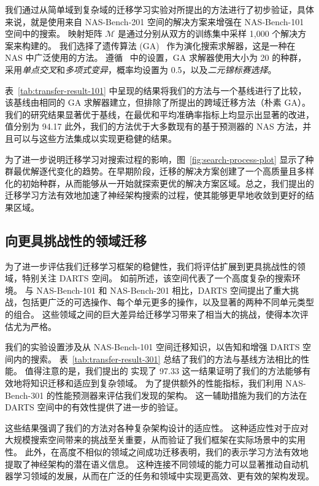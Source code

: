 \documentclass[../main_zh.tex]{subfiles}
\begin{document}
我们通过从简单域到复杂域的迁移学习实验对所提出的方法进行了初步验证，具体来说，就是使用来自 NAS-Bench-201 空间的解决方案来增强在 NAS-Bench-101 空间中的搜索。
映射矩阵 \( \mathcal{M} \) 是通过分别从双方的训练集中采样 1,000 个解决方案来构建的。
我们选择了遗传算法 (GA)~\cite{HollandGA1992} 作为演化搜索求解器，这是一种在 NAS 中广泛使用的方法。
遵循~\cite{DBLP:conf/iconip/HouDFQ21} 中的设置，GA 求解器使用大小为 20 的种群，采用\textit{单点交叉}和\textit{多项式变异}，概率均设置为 0.5，以及\textit{二元锦标赛选择}。

表~\ref{tab:transfer-result-101} 中呈现的结果将我们的方法与一个基线进行了比较，该基线由相同的 GA 求解器建立，但排除了所提出的跨域迁移方法（朴素 GA）。
我们的研究结果显著优于基线，在最优和平均准确率指标上均显示出显著的改进，值分别为 94.17%
此外，我们的方法优于大多数现有的基于预测器的 NAS 方法，并且可以与这些方法集成以实现更稳健的结果。

为了进一步说明迁移学习对搜索过程的影响，图~\ref{fig:search-process-plot} 显示了种群最优解逐代变化的趋势。在早期阶段，迁移的解决方案创建了一个高质量且多样化的初始种群，从而能够从一开始就探索更优的解决方案区域。总之，我们提出的迁移学习方法有效地加速了神经架构搜索的过程，使其能够更早地收敛到更好的结果区域。


\subsection{向更具挑战性的领域迁移}

为了进一步评估我们迁移学习框架的稳健性，我们将评估扩展到更具挑战性的领域，特别关注 DARTS 空间。
如前所述，该空间代表了一个高度复杂的搜索环境。
与 NAS-Bench-101 和 NAS-Bench-201 相比，DARTS 空间提出了重大挑战，包括更广泛的可选操作、每个单元更多的操作，以及显著的两种不同单元类型的组合。
这些领域之间的巨大差异给迁移学习带来了相当大的挑战，使得本次评估尤为严格。

我们的实验设置涉及从 NAS-Bench-101 空间迁移知识，以告知和增强 DARTS 空间内的搜索。
表~\ref{tab:transfer-result-301} 总结了我们的方法与基线方法相比的性能。
值得注意的是，我们提出的 \OUR{} 实现了 97.33%
这一结果证明了我们的方法能够有效地将知识迁移和适应到复杂领域。
为了提供额外的性能指标，我们利用 NAS-Bench-301 的性能预测器来评估我们发现的架构。
这一辅助措施为我们的方法在 DARTS 空间中的有效性提供了进一步的验证。

这些结果强调了我们的方法对各种复杂架构设计的适应性。
这种适应性对于应对大规模搜索空间带来的挑战至关重要，从而验证了我们框架在实际场景中的实用性。
此外，在高度不相似的领域之间成功迁移表明，我们的表示学习方法有效地提取了神经架构的潜在语义信息。
这种连接不同领域的能力可以显著推动自动机器学习领域的发展，从而在广泛的任务和领域中实现更高效、更有效的架构发现。
\end{document}
